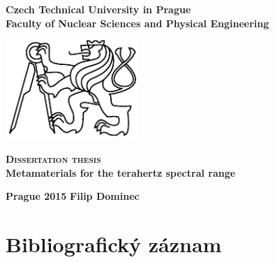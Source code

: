 \begin{center}
	\Large{\textbf{
Czech Technical University in Prague\\
Faculty of Nuclear Sciences and Physical Engineering\\ 
}}
 \vspace{3cm}

\includegraphics[width=5cm]{img/LogoCVUT}
\vspace{2cm}

\huge{\textbf{\scshape Dissertation thesis}}\\
\vspace{5mm}
{\LARGE\textbf{Metamaterials for the terahertz spectral range\\}}
\end{center}

\date{ } 			


 \vfill
\begin{minipage}{\textwidth}
\Large{\textbf{Prague 2015}} \hfill \Large{\textbf{Filip Dominec}}
\end{minipage}


\thispagestyle{empty} \newpage \setcounter{page}{1}

\chapter*{Bibliografický záznam}

